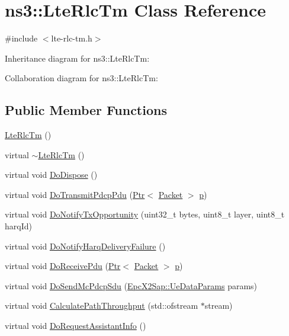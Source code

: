 \hypertarget{classns3_1_1LteRlcTm}{}\section{ns3\+:\+:Lte\+Rlc\+Tm Class Reference}
\label{classns3_1_1LteRlcTm}


{\ttfamily \#include $<$lte-\/rlc-\/tm.\+h$>$}



Inheritance diagram for ns3\+:\+:Lte\+Rlc\+Tm\+:


Collaboration diagram for ns3\+:\+:Lte\+Rlc\+Tm\+:
\subsection*{Public Member Functions}
\begin{DoxyCompactItemize}
\item 
\hyperlink{classns3_1_1LteRlcTm_a9f887c7a65a4ca372437ada28c6cae03}{Lte\+Rlc\+Tm} ()
\item 
virtual \hyperlink{classns3_1_1LteRlcTm_aa2ae12463c0ee2c4bbd30ee0ca65e5dc}{$\sim$\+Lte\+Rlc\+Tm} ()
\item 
virtual void \hyperlink{classns3_1_1LteRlcTm_a8e64bf6a5291d7a8476ca990fc0611c0}{Do\+Dispose} ()
\item 
virtual void \hyperlink{classns3_1_1LteRlcTm_a9c3f90afde1ca6665a9744a648e1dc9b}{Do\+Transmit\+Pdcp\+Pdu} (\hyperlink{classns3_1_1Ptr}{Ptr}$<$ \hyperlink{classns3_1_1Packet}{Packet} $>$ \hyperlink{lte__link__budget__x2__handover__measures_8m_ac9de518908a968428863f829398a4e62}{p})
\item 
virtual void \hyperlink{classns3_1_1LteRlcTm_aeb4bc654a99335459259c0f69650f79b}{Do\+Notify\+Tx\+Opportunity} (uint32\+\_\+t bytes, uint8\+\_\+t layer, uint8\+\_\+t harq\+Id)
\item 
virtual void \hyperlink{classns3_1_1LteRlcTm_a98a3a154f2a6316aefb82fa8b2aacf2d}{Do\+Notify\+Harq\+Delivery\+Failure} ()
\item 
virtual void \hyperlink{classns3_1_1LteRlcTm_ae9d86b7d5185d0cdbcd1304eb0826106}{Do\+Receive\+Pdu} (\hyperlink{classns3_1_1Ptr}{Ptr}$<$ \hyperlink{classns3_1_1Packet}{Packet} $>$ \hyperlink{lte__link__budget__x2__handover__measures_8m_ac9de518908a968428863f829398a4e62}{p})
\item 
virtual void \hyperlink{classns3_1_1LteRlcTm_a725a015757a5798f39deb2a5e400cf7c}{Do\+Send\+Mc\+Pdcp\+Sdu} (\hyperlink{structns3_1_1EpcX2Sap_1_1UeDataParams}{Epc\+X2\+Sap\+::\+Ue\+Data\+Params} params)
\item 
virtual void \hyperlink{classns3_1_1LteRlcTm_a3cdd5ff8645c0bfb01552f4050de7755}{Calculate\+Path\+Throughput} (std\+::ofstream $\ast$stream)
\item 
virtual void \hyperlink{classns3_1_1LteRlcTm_ab7c6a0f154e4840b9195f5bcac6787d1}{Do\+Request\+Assistant\+Info} ()
\end{DoxyCompactItemize}
